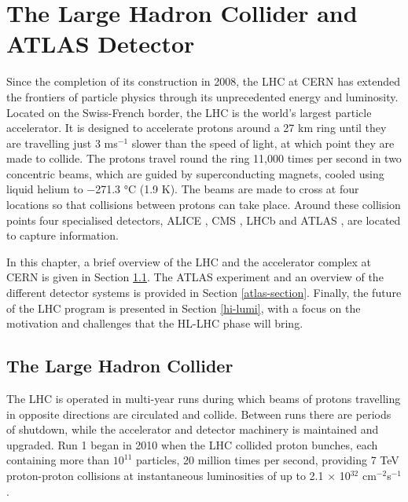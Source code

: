 \graphicspath{{\subfix{../images/}}}
\doublespacing

\chapter{The Large Hadron Collider and ATLAS Detector}
\label{chapter-2}

Since the completion of its construction in 2008, the \ac{LHC} \cite{Evans:2008zzb} at CERN has extended the frontiers of particle physics through its unprecedented energy and luminosity. Located on the Swiss-French border, the \ac{LHC} is the world’s largest particle accelerator. It is designed to accelerate protons around a 27 km ring until they are travelling just 3 ms$^{-1}$ slower than the speed of light, at which point they are made to collide. The protons travel round the ring 11,000 times per second in two concentric beams, which are guided by superconducting magnets, cooled using liquid helium to \num{-271.3} \si{\degree}C (1.9 K). The beams are made to cross at four locations so that collisions between protons can take place. Around these collision points four specialised detectors, ALICE \cite{AliceCollaboration_2008}, CMS \cite{CMS-TDR-08-001}, LHCb \cite{LHCbCollaboration_2008} and ATLAS \cite{PERF-2007-01}, are located to capture information.

In this chapter, a brief overview of the \ac{LHC} and the accelerator complex at CERN is given in Section \ref{the-lhc}. The ATLAS experiment and an overview of the different detector systems is provided in Section \ref{atlas-section}. Finally, the future of the \ac{LHC} program is presented in Section \ref{hi-lumi}, with a focus on the motivation and challenges that the  \ac{HL-LHC} phase will bring.


\section{The Large Hadron Collider}
\label{the-lhc}
The \ac{LHC} is operated in multi-year runs during which beams of protons travelling in opposite directions are circulated and collide. Between runs there are periods of shutdown, while the accelerator and detector machinery is maintained and upgraded. Run 1 began in 2010 when the \ac{LHC} collided proton bunches, each containing more than $10^{11}$ particles, 20 million times per second, providing 7 TeV proton-proton collisions at instantaneous luminosities of up to 2.1 $\times$ 10$^{32}$ cm$^{−2}$s$^{−1}$.

